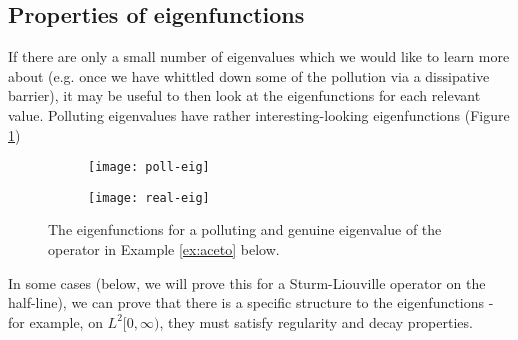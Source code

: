 \documentclass[../main.tex]{subfiles}
\begin{document}
\subsection{Properties of eigenfunctions}
If there are only a small number of eigenvalues which we would like to learn
more about (e.g. once we have whittled down some of the pollution via a
dissipative barrier), it may be useful to then look at the eigenfunctions for
each relevant value. Polluting eigenvalues have rather interesting-looking
eigenfunctions (Figure \ref{fig:eigfuncs})

\begin{figure}[h!]
  \centering
  \begin{subfigure}{0.4\textwidth}
    \texttt{[image: poll-eig]}
  \end{subfigure}
  \begin{subfigure}{0.4\textwidth}
    \texttt{[image: real-eig]}
  \end{subfigure}
  \caption{The eigenfunctions
  for a polluting and genuine eigenvalue of the operator in Example \ref{ex:aceto}
  below.}
\label{fig:eigfuncs}
\end{figure}

In some cases (below, we will prove this for a Sturm-Liouville operator on the
half-line), we can prove that there is a specific structure to the eigenfunctions -
for example, on $L^2[0, \infty)$, they must satisfy regularity and decay properties.
\end{document}

